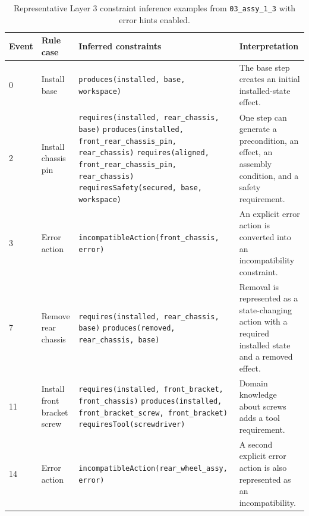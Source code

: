 \begin{table}[htbp]
\centering
\caption{Representative Layer 3 constraint inference examples from \texttt{03\_assy\_1\_3} with error hints enabled.}
\label{tab:evaluation-constraint-examples}
\scriptsize
\begin{tabular}{p{} p{} p{} p{}}
\toprule
Event & Rule case & Inferred constraints & Interpretation \\
\midrule
0 &
Install base &
\texttt{produces(installed, base, workspace)} &
The base step creates an initial installed-state effect. \\

2 &
Install chassis pin &
\texttt{requires(installed, rear\_chassis, base)}\newline
\texttt{produces(installed, front\_rear\_chassis\_pin, rear\_chassis)}\newline
\texttt{requires(aligned, front\_rear\_chassis\_pin, rear\_chassis)}\newline
\texttt{requiresSafety(secured, base, workspace)} &
One step can generate a precondition, an effect, an assembly condition, and a safety requirement. \\

3 &
Error action &
\texttt{incompatibleAction(front\_chassis, error)} &
An explicit error action is converted into an incompatibility constraint. \\

7 &
Remove rear chassis &
\texttt{requires(installed, rear\_chassis, base)}\newline
\texttt{produces(removed, rear\_chassis, base)} &
Removal is represented as a state-changing action with a required installed state and a removed effect. \\

11 &
Install front bracket screw &
\texttt{requires(installed, front\_bracket, front\_chassis)}\newline
\texttt{produces(installed, front\_bracket\_screw, front\_bracket)}\newline
\texttt{requiresTool(screwdriver)} &
Domain knowledge about screws adds a tool requirement. \\

14 &
Error action &
\texttt{incompatibleAction(rear\_wheel\_assy, error)} &
A second explicit error action is also represented as an incompatibility. \\
\bottomrule
\end{tabular}
\end{table}

